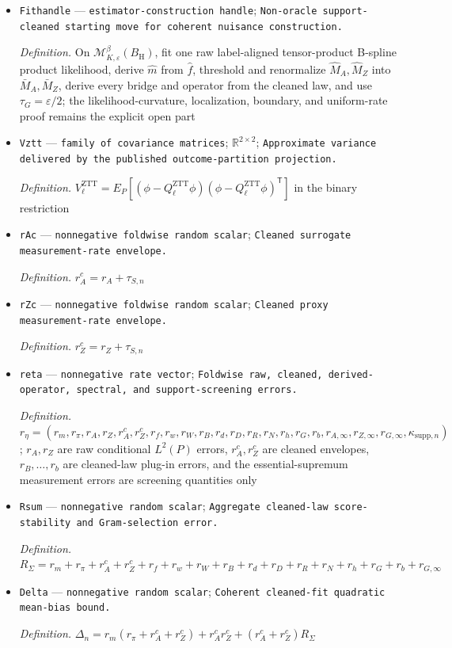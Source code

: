 \documentclass{article}
\begin{document}
\begin{itemize}
  \item \texttt{Fithandle} --- \texttt{estimator-\allowbreak{}construction handle}; \texttt{Non-\allowbreak{}oracle support-\allowbreak{}cleaned starting move for coherent nuisance construction.}
  \par\smallskip\noindent\emph{Definition.} On \(\mathcal M^{\beta}_{K,\varepsilon}(B_{\mathrm H})\), fit one raw label-aligned tensor-product B-spline product likelihood, derive \(\widehat m\) from \(\widehat f\), threshold and renormalize \(\widehat M_A,\widehat M_Z\) into \(\bar M_A,\bar M_Z\), derive every bridge and operator from the cleaned law, and use \(\tau_G=\varepsilon/2\); the likelihood-curvature, localization, boundary, and uniform-rate proof remains the explicit open part
  \item \texttt{Vztt} --- \texttt{family of covariance matrices}; \(\mathbb R^{2\times2}\); \texttt{Approximate variance delivered by the published outcome-\allowbreak{}partition projection.}
  \par\smallskip\noindent\emph{Definition.} \(V_{\ell}^{\mathrm{ZTT}}=E_P[(\phi-Q_{\ell}^{\mathrm{ZTT}}\phi)(\phi-Q_{\ell}^{\mathrm{ZTT}}\phi)^{\mathsf T}]\) in the binary restriction
  \item \texttt{rAc} --- \texttt{nonnegative foldwise random scalar}; \texttt{Cleaned surrogate measurement-\allowbreak{}rate envelope.}
  \par\smallskip\noindent\emph{Definition.} \(r_A^c=r_A+\tau_{S,n}\)
  \item \texttt{rZc} --- \texttt{nonnegative foldwise random scalar}; \texttt{Cleaned proxy measurement-\allowbreak{}rate envelope.}
  \par\smallskip\noindent\emph{Definition.} \(r_Z^c=r_Z+\tau_{S,n}\)
  \item \texttt{reta} --- \texttt{nonnegative rate vector}; \texttt{Foldwise raw,\allowbreak{} cleaned,\allowbreak{} derived-\allowbreak{}operator,\allowbreak{} spectral,\allowbreak{} and support-\allowbreak{}screening errors.}
  \par\smallskip\noindent\emph{Definition.} \(r_\eta=(r_m,r_\pi,r_A,r_Z,r_A^c,r_Z^c,r_f,r_w,r_W,r_B,r_d,r_D,r_R,r_N,r_h,r_G,r_b,r_{A,\infty},r_{Z,\infty},r_{G,\infty},\kappa_{\mathrm{supp},n})\); \(r_A,r_Z\) are raw conditional \(L^2(P)\) errors, \(r_A^c,r_Z^c\) are cleaned envelopes, \(r_B,\ldots,r_b\) are cleaned-law plug-in errors, and the essential-supremum measurement errors are screening quantities only
  \item \texttt{Rsum} --- \texttt{nonnegative random scalar}; \texttt{Aggregate cleaned-\allowbreak{}law score-\allowbreak{}stability and Gram-\allowbreak{}selection error.}
  \par\smallskip\noindent\emph{Definition.} \(R_{\Sigma}=r_m+r_\pi+r_A^c+r_Z^c+r_f+r_w+r_W+r_B+r_d+r_D+r_R+r_N+r_h+r_G+r_b+r_{G,\infty}\)
  \item \texttt{Delta} --- \texttt{nonnegative random scalar}; \texttt{Coherent cleaned-\allowbreak{}fit quadratic mean-\allowbreak{}bias bound.}
  \par\smallskip\noindent\emph{Definition.} \(\Delta_n=r_m(r_\pi+r_A^c+r_Z^c)+r_A^cr_Z^c+(r_A^c+r_Z^c)R_{\Sigma}\)
\end{itemize}
\end{document}
